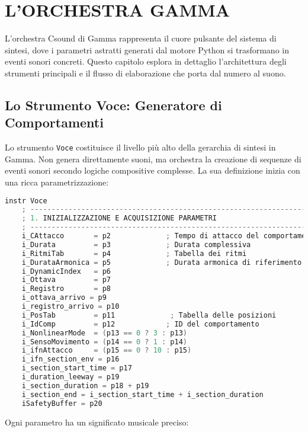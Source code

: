 
\section{L'ORCHESTRA GAMMA}
L'orchestra Csound di Gamma rappresenta il cuore pulsante del sistema di sintesi, dove i parametri astratti generati dal motore Python si trasformano in eventi sonori concreti. Questo capitolo esplora in dettaglio l'architettura degli strumenti principali e il flusso di elaborazione che porta dal numero al suono.
\subsection{Lo Strumento Voce: Generatore di Comportamenti}
Lo strumento \texttt{Voce} costituisce il livello più alto della gerarchia di sintesi in Gamma. Non genera direttamente suoni, ma orchestra la creazione di sequenze di eventi sonori secondo logiche compositive complesse. La sua definizione inizia con una ricca parametrizzazione:

\begin{lstlisting}[language=C]
instr Voce
    ; -----------------------------------------------------------------------
    ; 1. INIZIALIZZAZIONE E ACQUISIZIONE PARAMETRI
    ; -----------------------------------------------------------------------
    i_CAttacco       = p2             ; Tempo di attacco del comportamento
    i_Durata         = p3             ; Durata complessiva
    i_RitmiTab       = p4             ; Tabella dei ritmi
    i_DurataArmonica = p5             ; Durata armonica di riferimento
    i_DynamicIndex   = p6         
    i_Ottava         = p7             
    i_Registro       = p8             
    i_ottava_arrivo = p9
    i_registro_arrivo = p10
    i_PosTab         = p11             ; Tabella delle posizioni
    i_IdComp         = p12            ; ID del comportamento
    i_NonlinearMode  = (p13 == 0 ? 3 : p13)
    i_SensoMovimento = (p14 == 0 ? 1 : p14) 
    i_ifnAttacco     = (p15 == 0 ? 10 : p15)
    i_ifn_section_env = p16 
    i_section_start_time = p17
    i_duration_leeway = p19
    i_section_duration = p18 + p19
    i_section_end = i_section_start_time + i_section_duration
    iSafetyBuffer = p20
\end{lstlisting}

Ogni parametro ha un significato musicale preciso:

